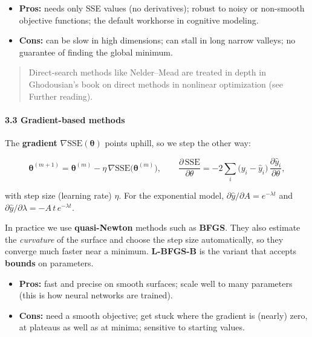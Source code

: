\begin{itemize}
\tightlist
\item
  \textbf{Pros:} needs only SSE values (no derivatives); robust to noisy
  or non-smooth objective functions; the default workhorse in cognitive
  modeling.
\item
  \textbf{Cons:} can be slow in high dimensions; can stall in long
  narrow valleys; no guarantee of finding the global minimum.
\end{itemize}

\begin{quote}
Direct-search methods like Nelder--Mead are treated in depth in
Ghodousian's book on direct methods in nonlinear optimization (see
Further reading).
\end{quote}

\paragraph{3.3 Gradient-based methods}

The \textbf{gradient} \(\nabla \mathrm{SSE}(\boldsymbol\theta)\) points
uphill, so we step the other way:

\[
\boldsymbol\theta^{(m+1)} = \boldsymbol\theta^{(m)} - \eta\,\nabla \mathrm{SSE}\big(\boldsymbol\theta^{(m)}\big),
\qquad
\frac{\partial\,\mathrm{SSE}}{\partial \theta} = -2 \sum_{i} \big(y_i - \hat y_i\big)\,\frac{\partial \hat y_i}{\partial \theta},
\]

with step size (learning rate) \(\eta\). For the exponential model,
\(\partial \hat y/\partial A = e^{-\lambda t}\) and
\(\partial \hat y/\partial \lambda = -A\,t\,e^{-\lambda t}\).

In practice we use \textbf{quasi-Newton} methods such as \textbf{BFGS}.
They also estimate the \emph{curvature} of the surface and choose the
step size automatically, so they converge much faster near a minimum.
\textbf{L-BFGS-B} is the variant that accepts \textbf{bounds} on
parameters.

\begin{itemize}
\tightlist
\item
  \textbf{Pros:} fast and precise on smooth surfaces; scale well to many
  parameters (this is how neural networks are trained).
\item
  \textbf{Cons:} need a smooth objective; get stuck where the gradient
  is (nearly) zero, at plateaus as well as at minima; sensitive to
  starting values.
\end{itemize}

